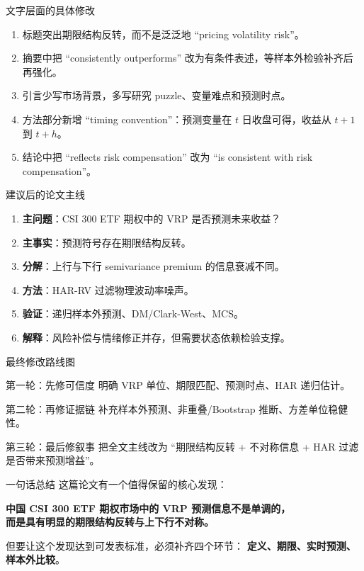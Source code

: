 \documentclass[UTF8,aspectratio=169]{ctexbeamer}
\begin{document}
\begin{frame}{文字层面的具体修改}
  \begin{enumerate}
    \item 标题突出期限结构反转，而不是泛泛地 ``pricing volatility risk''。
    \item 摘要中把 ``consistently outperforms'' 改为有条件表述，等样本外检验补齐后再强化。
    \item 引言少写市场背景，多写研究 puzzle、变量难点和预测时点。
    \item 方法部分新增 ``timing convention''：预测变量在 $t$ 日收盘可得，收益从 $t+1$ 到 $t+h$。
    \item 结论中把 ``reflects risk compensation'' 改为 ``is consistent with risk compensation''。
  \end{enumerate}
\end{frame}

\begin{frame}{建议后的论文主线}
  \begin{enumerate}
    \item \textbf{主问题}：CSI 300 ETF 期权中的 VRP 是否预测未来收益？
    \item \textbf{主事实}：预测符号存在期限结构反转。
    \item \textbf{分解}：上行与下行 semivariance premium 的信息衰减不同。
    \item \textbf{方法}：HAR-RV 过滤物理波动率噪声。
    \item \textbf{验证}：递归样本外预测、DM/Clark-West、MCS。
    \item \textbf{解释}：风险补偿与情绪修正并存，但需要状态依赖检验支撑。
  \end{enumerate}
\end{frame}

\begin{frame}{最终修改路线图}
  \begin{block}{第一轮：先修可信度}
    明确 VRP 单位、期限匹配、预测时点、HAR 递归估计。
  \end{block}

  \begin{block}{第二轮：再修证据链}
    补充样本外预测、非重叠/Bootstrap 推断、方差单位稳健性。
  \end{block}

  \begin{block}{第三轮：最后修叙事}
    把全文主线改为 ``期限结构反转 + 不对称信息 + HAR 过滤是否带来预测增益''。
  \end{block}
\end{frame}

\begin{frame}{一句话总结}
  \Large
  这篇论文有一个值得保留的核心发现：

  \vspace{0.4cm}
  \begin{center}
    \textbf{中国 CSI 300 ETF 期权市场中的 VRP 预测信息不是单调的，\\
    而是具有明显的期限结构反转与上下行不对称。}
  \end{center}

  \vspace{0.4cm}
  \normalsize
  但要让这个发现达到可发表标准，必须补齐四个环节：
  \textbf{定义、期限、实时预测、样本外比较}。
\end{frame}
\end{document}
